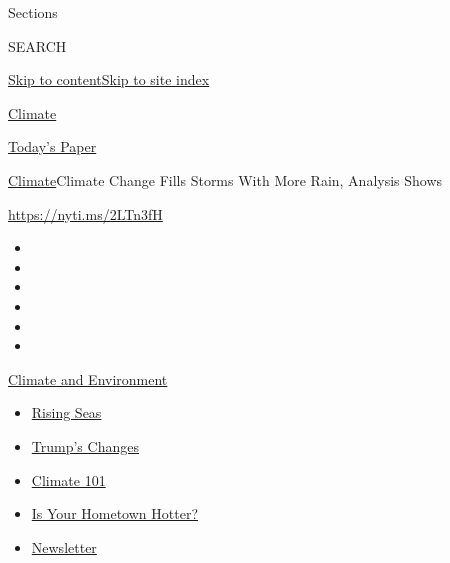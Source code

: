 Sections

SEARCH

\protect\hyperlink{site-content}{Skip to
content}\protect\hyperlink{site-index}{Skip to site index}

\href{https://www.nytimes.com/section/climate}{Climate}

\href{https://myaccount.nytimes.com/auth/login?response_type=cookie\&client_id=vi}{}

\href{https://www.nytimes.com/section/todayspaper}{Today's Paper}

\href{/section/climate}{Climate}\textbar{}Climate Change Fills Storms
With More Rain, Analysis Shows

\url{https://nyti.ms/2LTn3fH}

\begin{itemize}
\item
\item
\item
\item
\item
\item
\end{itemize}

\href{https://www.nytimes.com/section/climate?action=click\&pgtype=Article\&state=default\&region=TOP_BANNER\&context=storylines_menu}{Climate
and Environment}

\begin{itemize}
\tightlist
\item
  \href{https://www.nytimes.com/2020/07/30/climate/sea-level-inland-floods.html?action=click\&pgtype=Article\&state=default\&region=TOP_BANNER\&context=storylines_menu}{Rising
  Seas}
\item
  \href{https://www.nytimes.com/interactive/2020/climate/trump-environment-rollbacks.html?action=click\&pgtype=Article\&state=default\&region=TOP_BANNER\&context=storylines_menu}{Trump's
  Changes}
\item
  \href{https://www.nytimes.com/interactive/2020/04/19/climate/climate-crash-course-1.html?action=click\&pgtype=Article\&state=default\&region=TOP_BANNER\&context=storylines_menu}{Climate
  101}
\item
  \href{https://www.nytimes.com/interactive/2018/08/30/climate/how-much-hotter-is-your-hometown.html?action=click\&pgtype=Article\&state=default\&region=TOP_BANNER\&context=storylines_menu}{Is
  Your Hometown Hotter?}
\item
  \href{https://www.nytimes.com/newsletters/climate-change?action=click\&pgtype=Article\&state=default\&region=TOP_BANNER\&context=storylines_menu}{Newsletter}
\end{itemize}

